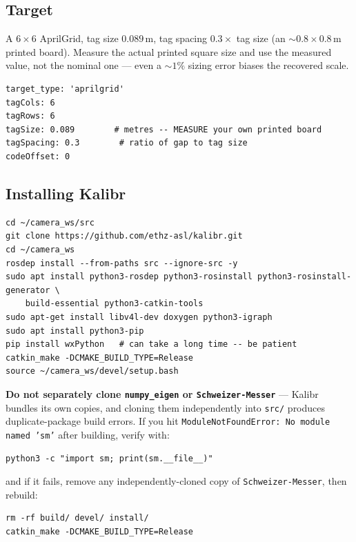 \documentclass[11pt]{report}
\begin{document}
\subsection{Target}

A $6\times6$ AprilGrid, tag size $0.089\,\mathrm{m}$, tag spacing $0.3\times$
tag size (an $\sim\!0.8\times0.8\,\mathrm{m}$ printed board). Measure the
actual printed square size and use the measured value, not the nominal one
--- even a $\sim\!1\%$ sizing error biases the recovered scale.

\begin{lstlisting}[style=code]
target_type: 'aprilgrid'
tagCols: 6
tagRows: 6
tagSize: 0.089        # metres -- MEASURE your own printed board
tagSpacing: 0.3        # ratio of gap to tag size
codeOffset: 0
\end{lstlisting}

\subsection{Installing Kalibr}

\begin{lstlisting}[style=shell]
cd ~/camera_ws/src
git clone https://github.com/ethz-asl/kalibr.git
cd ~/camera_ws
rosdep install --from-paths src --ignore-src -y
sudo apt install python3-rosdep python3-rosinstall python3-rosinstall-generator \
    build-essential python3-catkin-tools
sudo apt-get install libv4l-dev doxygen python3-igraph
sudo apt install python3-pip
pip install wxPython   # can take a long time -- be patient
catkin_make -DCMAKE_BUILD_TYPE=Release
source ~/camera_ws/devel/setup.bash
\end{lstlisting}

\textbf{Do not separately clone \texttt{numpy\_eigen} or
\texttt{Schweizer-Messer}} --- Kalibr bundles its own copies, and cloning
them independently into \texttt{src/} produces duplicate-package build
errors. If you hit \texttt{ModuleNotFoundError: No module named 'sm'} after
building, verify with:

\begin{lstlisting}[style=shell]
python3 -c "import sm; print(sm.__file__)"
\end{lstlisting}

and if it fails, remove any independently-cloned copy of
\texttt{Schweizer-Messer}, then rebuild:

\begin{lstlisting}[style=shell]
rm -rf build/ devel/ install/
catkin_make -DCMAKE_BUILD_TYPE=Release
\end{lstlisting}
\end{document}
